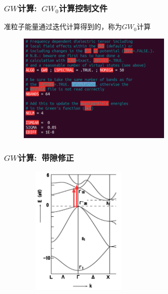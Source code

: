 \frame
{
	\frametitle{$GW$计算:~$GW_0$计算控制文件}
准粒子能量通过迭代计算得到的，称为$GW_0$计算
\vskip 5pt
{\fontsize{7.5pt}{5.2pt}}%
\begin{figure}[h!]
	\vskip -5pt
\centering
\includegraphics[height=2.1in,viewport=0 10 595 465,clip]{Figures/Si-GW0-INCAR.png}
\caption{\fontsize{6.2pt}{5.2pt}}%
\label{Si-GW0-INCAR}
\end{figure}
}

\frame
{
	\frametitle{$GW$计算:~带隙修正}
\begin{figure}[h!]
	\vskip -5pt
\centering
\includegraphics[height=2.5in, width=2.3in, viewport=0 0 375 490,clip]{Figures/Si-BSE-band.png}
\caption{\fontsize{6.2pt}{5.2pt}}%
\label{Si-GW-Band}
\end{figure}
{\fontsize{7.5pt}{5.2pt}}%
}

